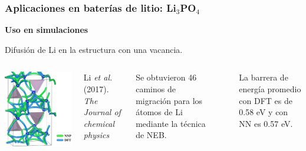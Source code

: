 \documentclass[aspectratio=169]{beamer}
\let\oldtextbf\textbf
\renewcommand{\textbf}[1]{\textcolor{nordblue}{\oldtextbf{#1}}}
\begin{document}
    \begin{frame}
        \frametitle{Aplicaciones en baterías de litio: Li$_3$PO$_4$}
            
        \textbf{Uso en simulaciones}

        Difusión de Li en la estructura con una vacancia.
        
        \begin{columns}
            \begin{center}
                \includegraphics[width=\columnwidth]{Li3PO4-neb.png}
            \end{center}
            \tiny{Li \textit{et al.} (2017). \textit{The Journal of chemical
            physics}}

            Se obtuvieron 46 caminos de migración para los átomos de Li mediante
            la técnica de NEB.

            \ \pause

            La barrera de energía promedio con DFT es de 0.58 eV y con NN es 
            0.57 eV.
        \end{columns}

    \end{frame}
    
\end{document}
